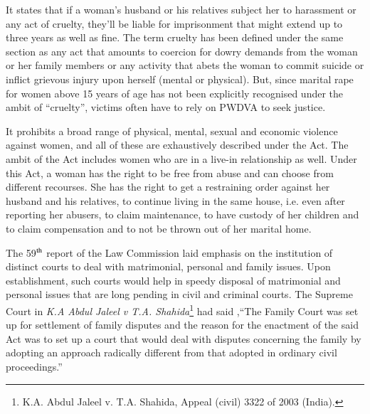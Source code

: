 \begin{multicols}{2}

\vspace{-.15cm}

\noi
It states that if a woman’s husband or his relatives subject her to harassment or any act of
cruelty, they’ll be liable for imprisonment that might extend up to three years as well as fine.
The term cruelty has been defined under the same section as any act that amounts to coercion
for dowry demands from the woman or her family members or any activity that abets the
woman to commit suicide or inflict grievous injury upon herself (mental or physical). But,
since marital rape for women above 15 years of age has not been explicitly recognised under
the ambit of “cruelty”, victims often have to rely on PWDVA to seek justice.

\vspace{-.15cm}


\vspace{-.15cm}

\noi
It prohibits a broad range of physical, mental, sexual and economic violence against women,
and all of these are exhaustively described under the Act. The ambit of the Act includes
women who are in a live-in relationship as well. Under this Act, a woman has the right to be
free from abuse and can choose from different recourses. She has the right to get a restraining
order against her husband and his relatives, to continue living in the same house, i.e. even
after reporting her abusers, to claim maintenance, to have custody of her children and to
claim compensation and to not be thrown out of her marital home.

\vspace{-.15cm}


\vspace{-.15cm}

\noi
The 59$^{\rm th}$ report of the Law Commission laid emphasis on the institution of distinct courts to
deal with matrimonial, personal and family issues. Upon establishment, such courts would
help in speedy disposal of matrimonial and personal issues that are long pending in civil and
criminal courts. The Supreme Court in \textit{K.A Abdul Jaleel v T.A. Shahida}\footnote{K.A. Abdul Jaleel v. T.A. Shahida, Appeal (civil) 3322 of 2003 (India).} had said ,“The
Family Court was set up for settlement of family disputes and the reason for the enactment of
the said Act was to set up a court that would deal with disputes concerning the family
by adopting an approach radically different from that adopted in ordinary civil proceedings.” 


\end{multicols}
